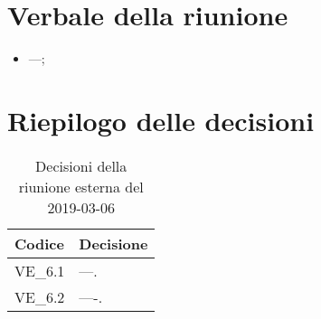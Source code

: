 \section{Verbale della riunione}
\begin{itemize}
	\item ---;
	

\end{itemize}

\hspace{3cm}

\section{Riepilogo delle decisioni}

	
	\begin{longtable}{ >{\centering}p{} >{}p{}}
		\caption{Decisioni della riunione esterna del 2019-03-06}\\	
		\rowcolorhead
		\textbf{\color{white}Codice} 
		& \centering\textbf{\color{white}Decisione} 
		\tabularnewline 
		\endfirsthead
		
		VE\_6.1 & ---.
		\tabularnewline
		VE\_6.2 & ----.
		
		
		
		
	\end{longtable}
	




